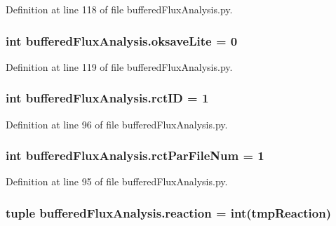 Definition at line 118 of file buffered\-Flux\-Analysis.\-py.

\hypertarget{namespacebuffered_flux_analysis_a8df8abbeab32a9f551cce00c3f8fc1b5}{
\subsubsection[{oksave\-Lite}]{\setlength{\rightskip}{0pt plus 5cm}int buffered\-Flux\-Analysis.\-oksave\-Lite = 0}}\label{namespacebuffered_flux_analysis_a8df8abbeab32a9f551cce00c3f8fc1b5}


Definition at line 119 of file buffered\-Flux\-Analysis.\-py.

\hypertarget{namespacebuffered_flux_analysis_ac7b9057f347140dc5ffb27b86665b372}{
\subsubsection[{rct\-I\-D}]{\setlength{\rightskip}{0pt plus 5cm}int buffered\-Flux\-Analysis.\-rct\-I\-D = 1}}\label{namespacebuffered_flux_analysis_ac7b9057f347140dc5ffb27b86665b372}


Definition at line 96 of file buffered\-Flux\-Analysis.\-py.

\hypertarget{namespacebuffered_flux_analysis_aa203d8968b82cc631fffe3da7c46ddfd}{
\subsubsection[{rct\-Par\-File\-Num}]{\setlength{\rightskip}{0pt plus 5cm}int buffered\-Flux\-Analysis.\-rct\-Par\-File\-Num = 1}}\label{namespacebuffered_flux_analysis_aa203d8968b82cc631fffe3da7c46ddfd}


Definition at line 95 of file buffered\-Flux\-Analysis.\-py.

\hypertarget{namespacebuffered_flux_analysis_ae2f3c773b4d02cc6548fa0199cd93d81}{
\subsubsection[{reaction}]{\setlength{\rightskip}{0pt plus 5cm}tuple buffered\-Flux\-Analysis.\-reaction = int(tmp\-Reaction)}}\label{namespacebuffered_flux_analysis_ae2f3c773b4d02cc6548fa0199cd93d81}


